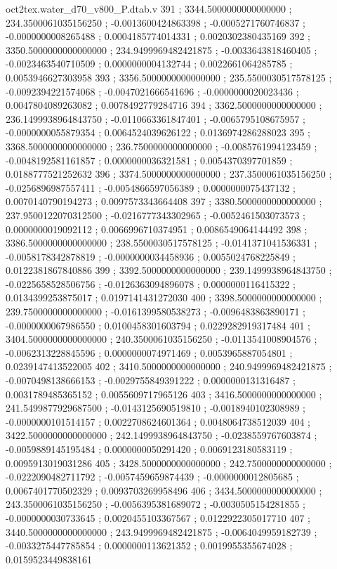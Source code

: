 \begin{filecontents}[overwrite]{oct2tex.water_d70_v800_P.dtab.v}
391 ; 3344.5000000000000000 ; 234.3500061035156250 ; -0.0013600424863398 ; -0.0005271760746837 ; -0.0000000008265488 ; 0.0004185774014331 ; 0.0020302380435169
392 ; 3350.5000000000000000 ; 234.9499969482421875 ; -0.0033643818460405 ; -0.0023463540710509 ; 0.0000000004132744 ; 0.0022661064285785 ; 0.0053946627303958
393 ; 3356.5000000000000000 ; 235.5500030517578125 ; -0.0092394221574068 ; -0.0047021666541696 ; -0.0000000020023436 ; 0.0047804089263082 ; 0.0078492779284716
394 ; 3362.5000000000000000 ; 236.1499938964843750 ; -0.0110663361847401 ; -0.0065795108675957 ; -0.0000000055879354 ; 0.0064524039626122 ; 0.0136974286288023
395 ; 3368.5000000000000000 ; 236.7500000000000000 ; -0.0085761994123459 ; -0.0048192581161857 ; 0.0000000036321581 ; 0.0054370397701859 ; 0.0188777521252632
396 ; 3374.5000000000000000 ; 237.3500061035156250 ; -0.0256896987557411 ; -0.0054866597056389 ; 0.0000000075437132 ; 0.0070140790194273 ; 0.0097573343664408
397 ; 3380.5000000000000000 ; 237.9500122070312500 ; -0.0216777343302965 ; -0.0052461503073573 ; 0.0000000019092112 ; 0.0066996710374951 ; 0.0086549064144492
398 ; 3386.5000000000000000 ; 238.5500030517578125 ; -0.0141371041536331 ; -0.0058178342878819 ; -0.0000000034458936 ; 0.0055024768225849 ; 0.0122381867840886
399 ; 3392.5000000000000000 ; 239.1499938964843750 ; -0.0225658528506756 ; -0.0126363094896078 ; 0.0000000116415322 ; 0.0134399253875017 ; 0.0197141431272030
400 ; 3398.5000000000000000 ; 239.7500000000000000 ; -0.0161399580538273 ; -0.0096483863890171 ; -0.0000000067986550 ; 0.0100458301603794 ; 0.0229282919317484
401 ; 3404.5000000000000000 ; 240.3500061035156250 ; -0.0113541008904576 ; -0.0062313228845596 ; 0.0000000074971469 ; 0.0053965887054801 ; 0.0239147413522005
402 ; 3410.5000000000000000 ; 240.9499969482421875 ; -0.0070498138666153 ; -0.0029755849391222 ; 0.0000000131316487 ; 0.0031789485365152 ; 0.0055609717965126
403 ; 3416.5000000000000000 ; 241.5499877929687500 ; -0.0143125690519810 ; -0.0018940102308989 ; -0.0000000101514157 ; 0.0022708624601364 ; 0.0048064738512039
404 ; 3422.5000000000000000 ; 242.1499938964843750 ; -0.0238559767603874 ; -0.0059889145195484 ; 0.0000000050291420 ; 0.0069123180583119 ; 0.0095913019031286
405 ; 3428.5000000000000000 ; 242.7500000000000000 ; -0.0222090482711792 ; -0.0057459659874439 ; -0.0000000012805685 ; 0.0067401770502329 ; 0.0093703269958496
406 ; 3434.5000000000000000 ; 243.3500061035156250 ; -0.0056395381689072 ; -0.0030505154281855 ; -0.0000000030733645 ; 0.0020455103367567 ; 0.0122922305017710
407 ; 3440.5000000000000000 ; 243.9499969482421875 ; -0.0064049959182739 ; -0.0033275447785854 ; 0.0000000113621352 ; 0.0019955355674028 ; 0.0159523449838161

\end{filecontents}
